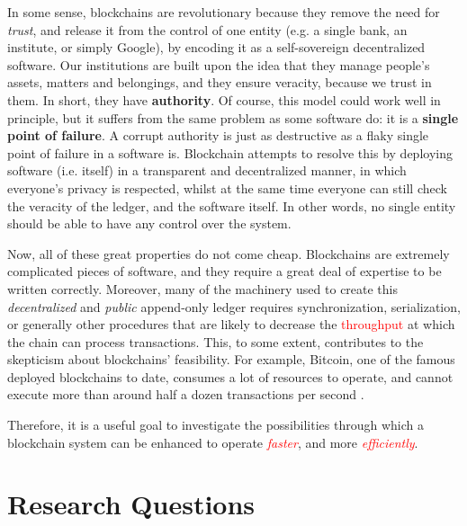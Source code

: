 In some sense, blockchains are revolutionary because they remove the need for \textit{trust}, and
release it from the control of one entity (e.g. a single bank, an institute, or simply Google), by encoding it as a
self-sovereign decentralized software. Our institutions are built upon the idea that they manage
people's assets, matters and belongings, and they ensure veracity, because we trust in them. In
short, they have \textbf{authority}. Of course, this model could work well in principle, but it
suffers from the same problem as some software do: it is a \textbf{single point of failure}. A
corrupt authority is just as destructive as a flaky single point of failure in a software is.
Blockchain attempts to resolve this by deploying software (i.e. itself) in a transparent and
decentralized manner, in which everyone's privacy is respected, whilst at the same time everyone can
still check the veracity of the ledger, and the software itself. In other words, no single entity
should be able to have any control over the system.

Now, all of these great properties do not come cheap. Blockchains are extremely complicated pieces
of software, and they require a great deal of expertise to be written correctly. Moreover, many of
the machinery used to create this \textit{decentralized} and \textit{public} append-only ledger
requires synchronization, serialization, or generally other procedures that are likely to decrease
the \textcolor{red}{throughput} at which the chain can process transactions. This, to some extent, contributes to the
skepticism about blockchains' feasibility. For example, Bitcoin, one of the famous deployed
blockchains to date, consumes a lot of resources to operate, and cannot execute more than around half a dozen transactions per second \cite{security_of_bitcoin}.

Therefore, it is a useful goal to investigate the possibilities through which a blockchain
system can be enhanced to operate \textcolor{red}{\textit{faster}}, and more \textcolor{red}{\textit{efficiently}}.

\section{Research Questions} \label{chap_intro:sec:resarch_q}

